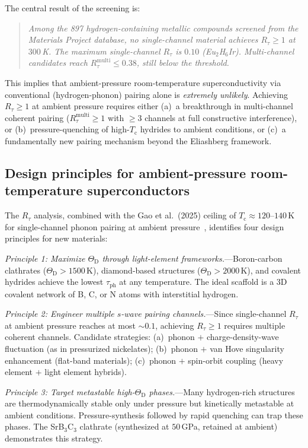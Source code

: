 \documentclass[prb,twocolumn,superscriptaddress,longbibliography,floatfix]{revtex4-2}
\newcommand{\tauasym}{\tau}
\newcommand{\taudec}{\tauasym_{\mathrm{ph}}}
\newcommand{\Rtau}{R_{\tauasym}}
\newcommand{\Tc}{T_{\mathrm{c}}}
\newcommand{\ThetaD}{\Theta_{\mathrm{D}}}
\begin{document}
The central result of the screening is:
\begin{quote}
\emph{Among the 897 hydrogen-containing metallic compounds
screened from the Materials Project database, no single-channel
material achieves $\Rtau \geq 1$ at $300\,$K.
The maximum single-channel $\Rtau$ is $0.10$ (Eu$_2$H$_6$Ir).
Multi-channel candidates reach $\Rtau^{\mathrm{multi}} \leq 0.38$,
still below the threshold.}
\end{quote}

This implies that ambient-pressure room-temperature
superconductivity via conventional (hydrogen-phonon) pairing
alone is \emph{extremely unlikely}.  Achieving $\Rtau \geq 1$
at ambient pressure requires either
(a)~a breakthrough in multi-channel coherent pairing
($\Rtau^{\mathrm{multi}} \geq 1$ with $\geq 3$ channels at
full constructive interference), or
(b)~pressure-quenching of high-$\Tc$ hydrides to ambient
conditions, or
(c)~a fundamentally new pairing mechanism beyond the
Eliashberg framework.

\subsection{Design principles for ambient-pressure room-temperature superconductors}

The $\Rtau$ analysis, combined with the Gao et al.\ (2025)
ceiling of $\Tc \approx 120$--$140\,$K for single-channel phonon
pairing at ambient pressure~\cite{Gao2025}, identifies four design
principles for new materials:

\emph{Principle 1: Maximize $\ThetaD$ through light-element
frameworks.}---Boron-carbon clathrates ($\ThetaD > 1500\,$K),
diamond-based structures ($\ThetaD > 2000\,$K), and covalent
hydrides achieve the lowest $\taudec$ at any temperature.
The ideal scaffold is a 3D covalent network of B, C, or N atoms
with interstitial hydrogen.

\emph{Principle 2: Engineer multiple $s$-wave pairing
channels.}---Since single-channel $\Rtau$ at ambient pressure
reaches at most $\sim 0.1$, achieving $\Rtau \geq 1$ requires
multiple coherent channels.  Candidate strategies:
(a)~phonon $+$ charge-density-wave fluctuation (as in pressurized
nickelates); (b)~phonon $+$ van Hove singularity enhancement
(flat-band materials); (c)~phonon $+$ spin-orbit coupling
(heavy element $+$ light element hybrids).

\emph{Principle 3: Target metastable high-$\ThetaD$
phases.}---Many hydrogen-rich structures are thermodynamically
stable only under pressure but kinetically metastable at ambient
conditions.  Pressure-synthesis followed by rapid quenching can
trap these phases.  The SrB$_3$C$_3$ clathrate (synthesized at
$50\,$GPa, retained at ambient) demonstrates this strategy.
\end{document}
